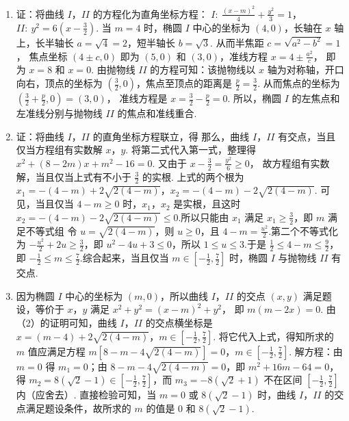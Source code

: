 \documentclass[UTF8,a4paper,oneside,11pt]{ctexbook}
\begin{document}
\begin{solution}
\begin{enumerate}
\item 证：将曲线 \(I\)，\(II\) 的方程化为直角坐标方程：
\(I:\ \frac{(x-m)^{2}}{4}+\frac{y^{2}}{3}=1\)，\(II:\ y^{2}=6\left(x-\frac{3}{2}\right)\).
当 \(m = 4\) 时，椭圆 \(I\) 中心的坐标为 \((4,0)\)，长轴在 \(x\) 轴上，长半轴长 \(a = \sqrt{4} = 2\)，短半轴长 \(b = \sqrt{3}\). 从而半焦距
\(c = \sqrt{a^2 - b^2} = 1\)，
焦点坐标 \((4 \pm c,0)\) 即为 \((5,0)\) 和 \((3,0)\)，准线方程
\(x = 4 \pm \frac{a^2}{c}\)，
即为 \(x = 8\) 和 \(x = 0\).
由抛物线 \(II\) 的方程可知：该抛物线以 \(x\) 轴为对称轴，开口向右，顶点的坐标为 \(\left(\frac{3}{2},0\right)\)，焦点至顶点的距离是 \(\frac{p}{2}=\frac{3}{2}\). 从而焦点的坐标为
\(\left(\frac{3}{2}+\frac{p}{2},0\right)=(3,0)\)，
准线方程是
\(x=\frac{3}{2}-\frac{p}{2}=0\).
所以，椭圆 \(I\) 的左焦点和左准线分别与抛物线 \(II\) 的焦点和准线重合.

\item 证：将曲线 \(I\)，\(II\) 的直角坐标方程联立，得
那么，曲线 \(I\)，\(II\) 有交点，当且仅当方程组有实数解 \(x\)，\(y\). 将第二式代入第一式，整理得
\(x^{2}+(8-2m)x+m^{2}-16=0\).
又由于
\(x - \frac{3}{2} = \frac{y^2}{6} \geq 0\)，
故方程组有实数解，当且仅当上式有不小于 \(\frac{3}{2}\) 的实根.
上式的两个根为
\(x_{1}=-(4-m)+2\sqrt{2(4-m)}\)，\(x_{2}=-(4-m)-2\sqrt{2(4-m)}\).
可见，当且仅当 \(4-m\geqslant0\) 时，\(x_1\)，\(x_2\) 是实根，且这时 \(x_2=-(4-m)-2\sqrt{2(4-m)}\leqslant0\).所以只能由 \(x_1\) 满足 \(x_1\geqslant\frac32\)，即 \(m\) 满足不等式组
令 \(u=\sqrt{2(4-m)}\)，则 \(u\geqslant0\)，且 \(4-m=\frac{u^{2}}2\).第二个不等式化为 \(-\frac{u^{2}}2+2u\geqslant\frac32\)，即 \(u^{2}-4u+3\leqslant0\)，所以 \(1\leqslant u\leqslant3\).于是 \(\frac12\leqslant4-m\leqslant\frac92\)，即 \(-\frac12\leqslant m\leqslant\frac72\).综合起来，当且仅当 \(m\in\left[-\frac12,\frac72\right]\) 时，椭圆 \(I\) 与抛物线 \(II\) 有交点.

\item 因为椭圆 \(I\) 中心的坐标为 \((m,0)\)，所以曲线 \(I\)，\(II\) 的交点 \((x, y)\) 满足题设，等价于 \(x\)，\(y\) 满足
\(x^{2} + y^{2} = (x - m)^{2} + y^{2}\)，
即
\(m(m-2x)=0\).
由（2）的证明可知，曲线 \(I\)，\(II\) 的交点横坐标是
\(x = (m - 4) + 2 \sqrt{2(4 - m)}\)，\(m \in \left[-\frac{1}{2}, \frac{7}{2}\right]\).
将它代入上式，得知所求的 \(m\) 值应满足方程
\(m \left[ 8 - m - 4 \sqrt{2 (4 - m)} \right] = 0\)，\(m \in \left[-\frac{1}{2}, \frac{7}{2}\right]\).
解方程：由 \(m = 0\) 得 \(m_{1} = 0\)；由 \(8 - m - 4\sqrt{2(4 - m)} = 0\)，即
\(m^{2} + 16m - 64 = 0\)，
得 \(m_{2} = 8(\sqrt{2} -1)\in \left[-\frac{1}{2},\frac{7}{2}\right]\)，而 \(m_{3} = -8(\sqrt{2} +1)\) 不在区间 \(\left[-\frac{1}{2},\frac{7}{2}\right]\) 内（应舍去）. 直接检验可知，当 \(m = 0\) 或 \(8(\sqrt{2} - 1)\) 时，曲线 \(I\)，\(II\) 的交点满足题设条件，故所求的 \(m\) 的值是 \(0\) 和 \(8(\sqrt{2} - 1)\).
\end{enumerate}
\end{solution}
\end{document}
